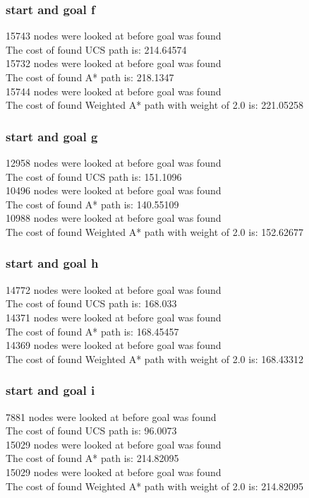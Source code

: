 \documentclass[11pt]{article} %
\begin{document}
\subsubsection{start and goal f}
15743 nodes were looked at before goal was found\\
The cost of found UCS path is: 214.64574\\
15732 nodes were looked at before goal was found\\
The cost of found A* path is: 218.1347\\
15744 nodes were looked at before goal was found\\
The cost of found Weighted A* path with weight of 2.0 is: 221.05258\\
\subsubsection{start and goal g}
12958 nodes were looked at before goal was found\\
The cost of found UCS path is: 151.1096\\
10496 nodes were looked at before goal was found\\
The cost of found A* path is: 140.55109\\
10988 nodes were looked at before goal was found\\
The cost of found Weighted A* path with weight of 2.0 is: 152.62677\\
\subsubsection{start and goal h}
14772 nodes were looked at before goal was found\\
The cost of found UCS path is: 168.033\\
14371 nodes were looked at before goal was found\\
The cost of found A* path is: 168.45457\\
14369 nodes were looked at before goal was found\\
The cost of found Weighted A* path with weight of 2.0 is: 168.43312\\
\subsubsection{start and goal i}
7881 nodes were looked at before goal was found\\
The cost of found UCS path is: 96.0073\\
15029 nodes were looked at before goal was found\\
The cost of found A* path is: 214.82095\\
15029 nodes were looked at before goal was found\\
The cost of found Weighted A* path with weight of 2.0 is: 214.82095\\
\end{document}
